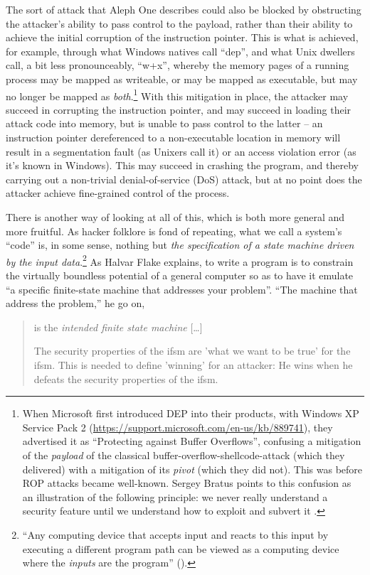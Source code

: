 \documentclass[12pt,glossary]{dalthesis}
\begin{document}
The sort of attack that Aleph One describes could also be blocked by
obstructing the attacker's ability to pass control to the payload, rather than
their ability to achieve the initial corruption of the instruction pointer. This
is what is achieved, for example, through what Windows natives call ``\gls{dep}'',
and what Unix dwellers call, a bit less
pronounceably, ``\gls{w+x}'', whereby the memory pages of a
running process may be mapped as writeable, or may be mapped as executable, but
may no longer be mapped as \emph{both}.\footnote{When Microsoft first introduced DEP into their products,
with Windows XP Service Pack 2
(\url{https://support.microsoft.com/en-us/kb/889741}), they advertised it as
``Protecting against Buffer Overflows'', confusing a mitigation of the \emph{payload}
of the classical buffer-overflow-shellcode-attack (which they delivered) with a
mitigation of its \emph{pivot} (which they did not). This was before ROP attacks
became well-known. Sergey Bratus points to this confusion as an illustration of
the following principle: we never really understand a security feature until we
understand how to exploit and subvert it \cite{bratus16}.} With this mitigation
in place, the attacker may succeed in corrupting the instruction pointer, and
may succeed in loading their attack code into memory, but is unable to pass
control to the latter -- an instruction pointer dereferenced to a non-executable
location in memory will result in a segmentation fault (as Unixers call it) or
an access violation error (as it's known in Windows). This may succeed in
crashing the program, and thereby carrying out a non-trivial denial-of-service
(DoS) attack, but at no point does the attacker achieve fine-grained control of
the process.

There is another way of looking at all of this, which is both more general and
more fruitful. As hacker folklore is fond of repeating, what we call a system's
``code'' is, in some sense, nothing but \emph{the specification of a state machine
driven by the input data}.\footnote{``Any computing device that accepts input and reacts to this input
by executing a different program path can be viewed as a computing device where
the \emph{inputs} are the program'' (\cite{flake16}).} As Halvar Flake explains, to write a program
is to constrain the virtually boundless potential of a general computer so as to
have it emulate ``a specific finite-state machine that addresses your problem''.
``The machine that address the problem,'' he go on,

\begin{quote}
is the \emph{intended finite state machine} [\ldots{}]

The security properties of the \gls{ifsm} are 'what we want to be true' for the
\gls{ifsm}. This is needed to define 'winning' for an attacker: He wins when he
defeats the security properties of the \gls{ifsm}. 
\end{quote}
\end{document}
